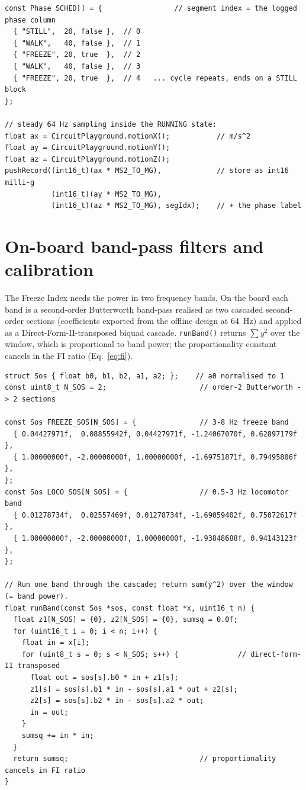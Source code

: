 \documentclass[11pt,a4paper]{article}
\begin{document}
\begin{lstlisting}[style=cpp,caption={Scripted schedule and per-sample logging (cpx\_fog\_logger.ino).}]
const Phase SCHED[] = {                 // segment index = the logged phase column
  { "STILL",  20, false },  // 0
  { "WALK",   40, false },  // 1
  { "FREEZE", 20, true  },  // 2
  { "WALK",   40, false },  // 3
  { "FREEZE", 20, true  },  // 4   ... cycle repeats, ends on a STILL block
};

// steady 64 Hz sampling inside the RUNNING state:
float ax = CircuitPlayground.motionX();           // m/s^2
float ay = CircuitPlayground.motionY();
float az = CircuitPlayground.motionZ();
pushRecord((int16_t)(ax * MS2_TO_MG),             // store as int16 milli-g
           (int16_t)(ay * MS2_TO_MG),
           (int16_t)(az * MS2_TO_MG), segIdx);    // + the phase label
\end{lstlisting}

\section{On-board band-pass filters and calibration}
\label{app:filters}

The Freeze Index needs the power in two frequency bands. On the board each band is a
second-order Butterworth band-pass realised as two cascaded second-order sections
(coefficients exported from the offline design at \SI{64}{\hertz}) and applied as a
Direct-Form-II-transposed biquad cascade. \texttt{runBand()} returns
$\sum y^2$ over the window, which is proportional to band power; the proportionality
constant cancels in the FI ratio (Eq.~\ref{eq:fi}).

\begin{lstlisting}[style=cpp,caption={Deployed band-pass coefficients and the biquad cascade (cpx\_fog\_standalone.ino).}]
struct Sos { float b0, b1, b2, a1, a2; };    // a0 normalised to 1
const uint8_t N_SOS = 2;                      // order-2 Butterworth -> 2 sections

const Sos FREEZE_SOS[N_SOS] = {               // 3-8 Hz freeze band
  { 0.04427971f,  0.08855942f, 0.04427971f, -1.24067070f, 0.62897179f },
  { 1.00000000f, -2.00000000f, 1.00000000f, -1.69751871f, 0.79495806f },
};
const Sos LOCO_SOS[N_SOS] = {                 // 0.5-3 Hz locomotor band
  { 0.01278734f,  0.02557469f, 0.01278734f, -1.69059402f, 0.75072617f },
  { 1.00000000f, -2.00000000f, 1.00000000f, -1.93848688f, 0.94143123f },
};

// Run one band through the cascade; return sum(y^2) over the window (= band power).
float runBand(const Sos *sos, const float *x, uint16_t n) {
  float z1[N_SOS] = {0}, z2[N_SOS] = {0}, sumsq = 0.0f;
  for (uint16_t i = 0; i < n; i++) {
    float in = x[i];
    for (uint8_t s = 0; s < N_SOS; s++) {              // direct-form-II transposed
      float out = sos[s].b0 * in + z1[s];
      z1[s] = sos[s].b1 * in - sos[s].a1 * out + z2[s];
      z2[s] = sos[s].b2 * in - sos[s].a2 * out;
      in = out;
    }
    sumsq += in * in;
  }
  return sumsq;                               // proportionality cancels in FI ratio
}
\end{lstlisting}
\end{document}
